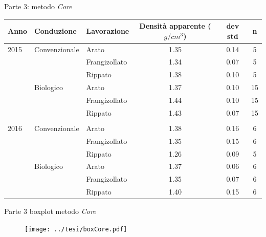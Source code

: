 \documentclass[10pt]{beamer}
\begin{document}
\begin{frame}[label=Core]{Parte 3: metodo \emph{Core}}

  
  \hyperlink{finale}{}
  \footnotesize
  \begin{table}[ht]
    \centering
    \begin{tabular}{lllccc}
      \hline
      Anno & Conduzione & Lavorazione & Densit\`a apparente
                                        ($g/cm^3$) & dev std & n \\ 
      \hline
      2015 & Convenzionale & Arato & 1.35 & 0.14 &   5 \\ 
           &               & Frangizollato & 1.34 & 0.07 &   5 \\ 
           &               & Rippato & 1.38 & 0.10 &   5 \\ 
           & Biologico     & Arato & 1.37 & 0.10 &  15 \\ 
           &               & Frangizollato & 1.44 & 0.10 &  15 \\ 
           &               & Rippato & 1.43 & 0.07 &  15 \\ 
      \\
      2016 & Convenzionale & Arato & 1.38 & 0.16 &   6 \\ 
           &               & Frangizollato & 1.35 & 0.15 &   6 \\ 
           &               & Rippato & 1.26 & 0.09 &   5 \\ 
           & Biologico     & Arato & 1.37 & 0.06 &   6 \\ 
           &               & Frangizollato & 1.35 & 0.07 &   6 \\ 
           &               & Rippato & 1.40 & 0.15 &   6 \\ 
      \hline
    \end{tabular}
    \label{tab:RiassuntoDensitaCAmpo}
  \end{table}
\end{frame}


\begin{frame}{Parte 3 \small{boxplot metodo \emph{Core}}}
  
  \begin{figure}
    \texttt{[image: ../tesi/boxCore.pdf]}
  \end{figure}
\end{frame}
\end{document}
